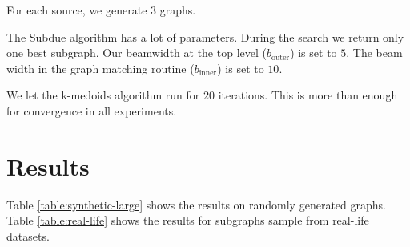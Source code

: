 \documentclass{article}
\begin{document}
For each source, we generate $3$ graphs.

The Subdue algorithm has a lot of parameters. During the search we return only one best subgraph. Our beamwidth at the top level ($b_{\mbox{outer}}$) is set to $5$. The beam width in the graph matching routine ($b_{\mbox{inner}}$) is set to $10$.  

We let the k-medoids algorithm run for $20$ iterations. This is more than enough for convergence in all experiments. 

\section*{Results}

Table \ref{table:synthetic-large} shows the results on randomly generated graphs. Table \ref{table:real-life} shows the results for subgraphs sample from real-life datasets.  
\end{document}

